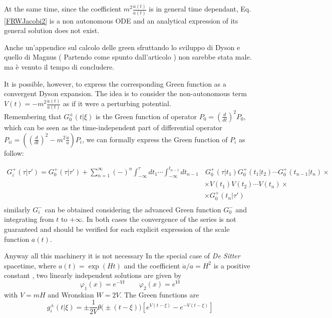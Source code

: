 \documentclass[Main]{subfiles}
\begin{document}
			At the same time, since the coefficient $m^2 \frac{\ddot{a}(t)}{a(t)}$ is in general time dependant,  Eq. \ref{FRWJacobi2} is a non autonomous ODE and an analytical expression of its general solution does not exist.
\ifToninus
	\begin{Warning}	
		Anche un'appendice sul calcolo delle green sfruttando lo sviluppo di Dyson e quello di Magnus ( Partendo come spunto dall'articolo \cite{Dappiaggi2014}) non sarebbe stata male. ma è venuto il tempo di concludere.
	\end{Warning}
\fi	
			It is possible, however, to express the corresponding Green function as a convergent Dyson expansion\cite{Dappiaggi2014}.
			The idea is to consider the non-autonomous term $V(t) = -m^2 \frac{\ddot{a}(t)}{a(t)}$ as if it were a perturbing potential.\\
			Remembering that $G^\pm_0 (t \vert \xi)$ is the Green function of operator \ifToninus$P_{0}=\left(\frac{d}{dt}\right)^2$\else$P_0$\fi, which can be seen as the time-independent part of differential operator \ifToninus$P_{i i}=\left( \left(\frac{d}{dt}\right)^2 - m^2 \frac{\ddot{a}}{a} \right)$\else$P_i$\fi, we can formally express the Green function of $P_{i}$ as follow:
			
			\begin{align*}
				G^+_i ( \tau \vert \tau' ) = G^+_0( \tau \vert \tau' ) + \sum_{n=1}^\infty (-)^n 
				\int_{-\infty}^\tau dt_1 \cdots \int_{-\infty}^{t_{n-1}} dt_{n-1} 
				& \,  G^+_0(\tau \vert t_1) G^+_0(t_1\vert t_2) \cdots G^+_0(t_{n-1} \vert t_n) \times \\
				& \times  V(t_1) V(t_2) \cdots V(t_n) \times \\
				& \times  G^+_0 (t_n \vert \tau' ) \\
			\end{align*}		
			similarly $G^-_i$  can be obtained considering the advanced Green function $G^-_0$ and integrating from $t$ to $+\infty$.
			In both cases the convergence of the series is not guaranteed and should be verified for each explicit expression of the scale function $a (t)$.
			
			\vspace{2mm}
			\ifToninus Anyway all this machinery it is not necessary \fi In the special case of \emph{De Sitter} spacetime, where $ a(t) = \exp(H t)$ and the coefficient $\ddot{a}/a=H^2$ is a positive constant  \cite{Wald1984}, 
			two linearly independent solutions are given by
			\begin{displaymath}
				\varphi_1(x) = e^{-V t} \qquad \varphi_2(x)= e^{Vt}
			\end{displaymath}
			with $V=m H$ and Wronskian $W= 2V$.
			The Green functions are
			\begin{displaymath}
								g^\pm_i(t \vert \xi) = \pm \frac{1}{2V}\theta\big(\pm(t-\xi)\big) \left[ e^{V(t-\xi)} - e^{-V(t-\xi)}\right]
			\end{displaymath}
\end{document}
